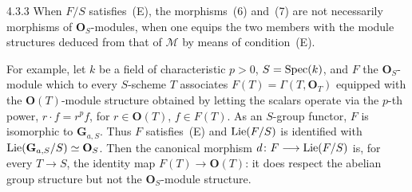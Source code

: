 \begin{remark}{4.3.3}\label{II.4.3.3}
{\renewcommand{\thefootnote}{(65)}}
When \(F/S\) satisfies~(E), the morphisms~(6) and~(7) are not necessarily
morphisms of \(\mathbf{O}_{S}\)-modules, when one equips the two members
with the module structures deduced from that of \(\mathcal{M}\) by means of
condition~(E).

For example, let \(k\) be a field of characteristic \(p>0\), \(S=\operatorname{Spec}(k)\),
and \(F\) the \(\mathbf{O}_{S}\)-module which to every \(S\)-scheme \(T\)
associates \(F(T)=\Gamma(T,\mathbf{O}_{T})\) equipped with the
\(\mathbf{O}(T)\)-module structure obtained by letting the scalars operate
via the \(p\)-th power, \ie \(r\cdot f=r^{p}f\), for \(r\in\mathbf{O}(T)\),
\(f\in F(T)\). As an \(S\)-group functor, \(F\) is isomorphic to
\(\mathbf{G}_{a,S}\). Thus \(F\) satisfies~(E) and \(\operatorname{Lie}(F/S)\) is identified with
\(\operatorname{Lie}(\mathbf{G}_{a,S}/S)\simeq\mathbf{O}_{S}\). Then the canonical morphism
\(d\colon F\longrightarrow\operatorname{Lie}(F/S)\) is, for every \(T\to S\), the identity map
\(F(T)\to\mathbf{O}(T)\): it does respect the abelian group structure but
not the \(\mathbf{O}_{S}\)-module structure.
\end{remark}

